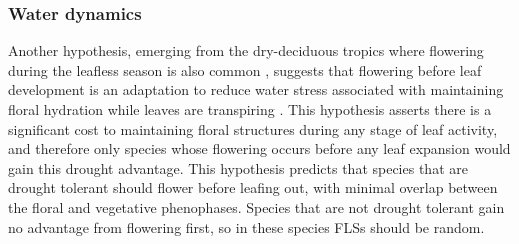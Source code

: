 \documentclass[12pt]{article}\usepackage[]{graphicx}\usepackage[]{color}
\begin{document}
\subsubsection*{Water dynamics}
\indent\indent Another hypothesis, emerging from the dry-deciduous tropics where flowering during the leafless season is also common \citep{Janzen1967}, suggests that flowering before leaf development is an adaptation to reduce water stress associated with maintaining floral hydration while leaves are transpiring \citep{Franklin2016}. %
This hypothesis asserts there is a significant cost to maintaining floral structures during any stage of leaf activity, and therefore only species whose flowering occurs before any leaf expansion would gain this drought advantage. This hypothesis predicts that species that are drought tolerant should flower before leafing out, with minimal overlap between the floral and vegetative phenophases. Species that are not drought tolerant gain no advantage from flowering first, so in these species FLSs should be random. %
\end{document}
